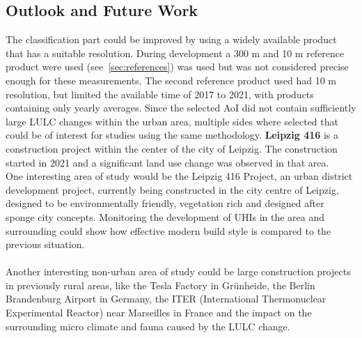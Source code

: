  
\subsection{Outlook and Future Work}\label{sec:future}

The classification part could be improved by using a widely available product that has a suitable resolution. 
During development a 300 m and 10 m reference product were used (see~\cref{sec:references}) was used but was not considered precise enough for these measurements.
The second reference product used had 10 m resolution, but limited the available time of 2017 to 2021, with products containing only yearly averages.
Since the selected \gls{AoI} did not contain sufficiently large \gls{LULC} changes within the urban area, multiple sides where selected that could be of interest for studies using the same methodology.
\textbf{Leipzig 416} is a construction project within the center of the city of Leipzig.
The construction started in 2021 and a significant land use change was observed in that area. \\
One interesting area of study would be the Leipzig 416 Project, an urban district development project, currently being constructed in the city centre of Leipzig, designed to be environmentally friendly, vegetation rich and designed after sponge city concepts.
Monitoring the development of \glspl{UHI} in the area and surrounding could show how effective modern build style is compared to the previous situation.\\
\\
Another interesting non-urban area of study could be large construction projects in previously rural areas, like the Tesla Factory in Grünheide, the Berlin Brandenburg Airport in Germany, the ITER (International Thermonuclear Experimental Reactor) near Marseilles in France and the impact on the surrounding micro climate and fauna caused by the \gls{LULC} change.


